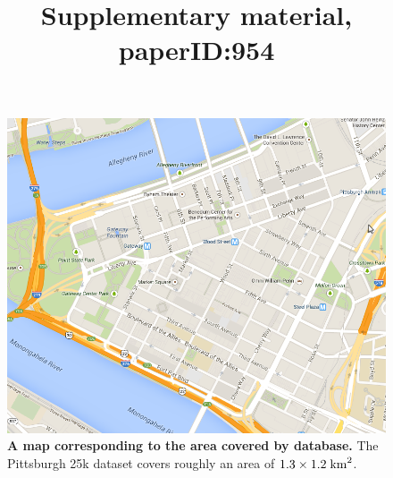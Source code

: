 \documentclass[10pt,onecolumn,A4]{article}
\title{Supplementary material, paperID:954}
\begin{document}
	\maketitle

\begin{figure}
	\center
	\includegraphics[trim = 55mm 40mm 55mm 25mm, clip=true,width=0.5\linewidth]{mapGoogle.png}
	\caption{ \textbf{A map corresponding to the area covered by database.}
		The Pittsburgh 25k dataset covers roughly an area of $1.3 \times 1.2 \; {\rm km}^2$.
	}
\end{figure}
\end{document}
